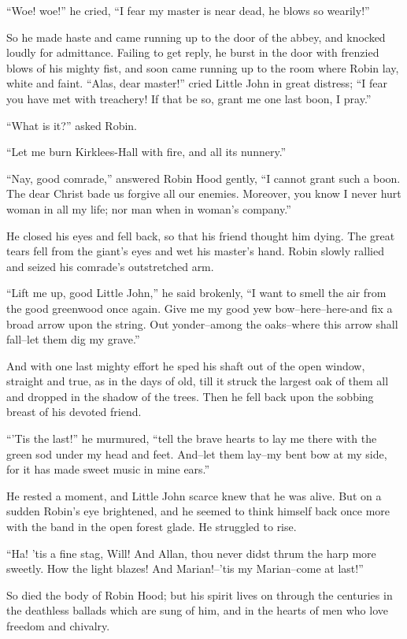 ``Woe! woe!'' he cried, ``I fear my master is near dead, he blows so
wearily!''

So he made haste and came running up to the door of the abbey, and
knocked loudly for admittance. Failing to get reply, he burst in the
door with frenzied blows of his mighty fist, and soon came running up to
the room where Robin lay, white and faint. ``Alas, dear master!'' cried
Little John in great distress; ``I fear you have met with treachery! If
that be so, grant me one last boon, I pray.''

``What is it?'' asked Robin.

``Let me burn Kirklees-Hall with fire, and all its nunnery.''

``Nay, good comrade,'' answered Robin Hood gently, ``I cannot grant such
a boon. The dear Christ bade us forgive all our enemies. Moreover, you
know I never hurt woman in all my life; nor man when in woman's
company.''

He closed his eyes and fell back, so that his friend thought him dying.
The great tears fell from the giant's eyes and wet his master's hand.
Robin slowly rallied and seized his comrade's outstretched arm.

``Lift me up, good Little John,'' he said brokenly, ``I want to smell
the air from the good greenwood once again. Give me my good yew
bow--here--here-and fix a broad arrow upon the string. Out yonder--among
the oaks--where this arrow shall fall--let them dig my grave.''

And with one last mighty effort he sped his shaft out of the open
window, straight and true, as in the days of old, till it struck the
largest oak of them all and dropped in the shadow of the trees. Then he
fell back upon the sobbing breast of his devoted friend.

``'Tis the last!'' he murmured, ``tell the brave hearts to lay me there
with the green sod under my head and feet. And--let them lay--my bent
bow at my side, for it has made sweet music in mine ears.''

He rested a moment, and Little John scarce knew that he was alive. But
on a sudden Robin's eye brightened, and he seemed to think himself back
once more with the band in the open forest glade. He struggled to rise.

``Ha! 'tis a fine stag, Will! And Allan, thou never didst thrum the harp
more sweetly. How the light blazes! And Marian!--'tis my Marian--come at
last!''

So died the body of Robin Hood; but his spirit lives on through the
centuries in the deathless ballads which are sung of him, and in the
hearts of men who love freedom and chivalry.

